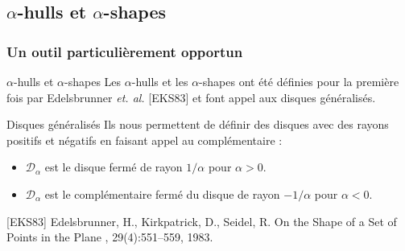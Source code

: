 \subsection{$\alpha$-hulls et $\alpha$-shapes}

\begin{frame}
\frametitle{Un outil particulièrement opportun}

\begin{block}{$\alpha$-hulls et $\alpha$-shapes}
  Les $\alpha$-hulls et les $\alpha$-shapes ont été définies pour la première fois par Edelsbrunner \emph{et. al.} [EKS83] et font appel aux disques généralisés.\\
\end{block}

\begin{block}{Disques généralisés }
  Ils nous permettent de définir des disques avec des rayons positifs et négatifs en faisant appel au complémentaire :

  \begin{itemize}
    \item $\mathcal{D}_{\alpha}$ est le disque fermé de rayon $1/\alpha$ pour $\alpha > 0$.
    \item $\mathcal{D}_{\alpha}$ est le complémentaire fermé du disque de rayon $- 1/\alpha$ pour $\alpha < 0$. 
  \end{itemize}
\end{block}

\scriptsize
\begin{thebibliography}{alpha}
  [EKS83] Edelsbrunner, H., Kirkpatrick, D., Seidel, R.
  \newblock On the Shape of a Set of Points in the Plane
  , 29(4):551--559, 1983.
\end{thebibliography}
\end{frame}


